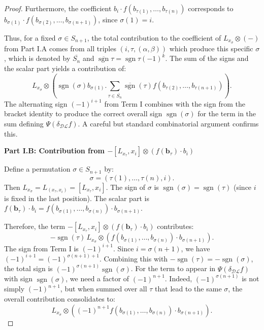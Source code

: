 \documentclass[10pt,a4paper]{amsart}
\newcommand{\DL}{\mathcal{DL}}
\begin{document}
\begin{proof}
Furthermore, the coefficient \(b_i \cdot f(b_{\tau(1)}, \dots, b_{\tau(n)})\) corresponds to \(b_{\sigma(1)} \cdot f(b_{\sigma(2)}, \dots, b_{\sigma(n+1)})\), since \(\sigma(1) = i\).

Thus, for a fixed \(\sigma \in S_{n+1}\), the total contribution to the coefficient of \(L_{x_\sigma} \otimes (-)\) from Part I.A comes from all triples \((i, \tau, (\alpha, \beta))\) which produce this specific \(\sigma\), which is denoted by $\overline{S_{n}}$ and $\overline{\operatorname{sgn}}\tau=\operatorname{sgn}\tau(-1)^k$. The sum of the signs and the scalar part yields a contribution of:
\[
L_{x_\sigma} \otimes \left( \operatorname{sgn}(\sigma) b_{\sigma(1)}.  \sum_{\tau \in \overline{S_{n}}}\overline{\operatorname{sgn}}(\tau)f(b_{\tau(2)}, \dots, b_{\tau(n+1)}) \right).
\]
The alternating sign \((-1)^{i+1}\) from Term I combines with the sign from the bracket identity to produce the correct overall sign \(\operatorname{sgn}(\sigma)\) for the term in the sum defining \(\Psi(\delta_{\DL} f)\). A careful but standard combinatorial argument confirms this.

\textbf{Part I.B: Contribution from \(- [L_{x_\tau}, x_i] \otimes (f(\mathbf{b}_\tau) \cdot b_i)\)}


Define a permutation \(\sigma \in S_{n+1}\) by:
\[
\sigma = (\tau(1), \dots, \tau(n), i).
\]
Then \(L_{x_\sigma} = L_{(x_\tau, x_i)} = [L_{x_\tau}, x_i]\). The sign of \(\sigma\) is \(\operatorname{sgn}(\sigma) = \operatorname{sgn}(\tau)\) (since \(i\) is fixed in the last position). The scalar part is \(f(\mathbf{b}_\tau) \cdot b_i = f(b_{\sigma(1)}, \dots, b_{\sigma(n)}) \cdot b_{\sigma(n+1)}\).

Therefore, the term \(- [L_{x_\tau}, x_i] \otimes (f(\mathbf{b}_\tau) \cdot b_i)\) contributes:
\[
- \operatorname{sgn}(\tau) \, L_{x_\sigma} \otimes (f(b_{\sigma(1)}, \dots, b_{\sigma(n)}) \cdot b_{\sigma(n+1)}).
\]
The sign from Term I is \((-1)^{i+1}\). Since \(i = \sigma(n+1)\), we have \((-1)^{i+1} = (-1)^{\sigma(n+1)+1}\). Combining this with \(-\operatorname{sgn}(\tau) = -\operatorname{sgn}(\sigma)\), the total sign is \((-1)^{\sigma(n+1)} \operatorname{sgn}(\sigma)\). For the term to appear in \(\Psi(\delta_{\DL} f)\) with sign \(\operatorname{sgn}(\sigma)\), we need a factor of \((-1)^{n+1}\). Indeed, \((-1)^{\sigma(n+1)}\) is not simply \((-1)^{n+1}\), but when summed over all \(\tau\) that lead to the same \(\sigma\), the overall contribution consolidates to:
\[
L_{x_\sigma} \otimes \left( (-1)^{n+1} f(b_{\sigma(1)}, \dots, b_{\sigma(n)}) \cdot b_{\sigma(n+1)} \right).
\]


\end{proof}
\end{document}
